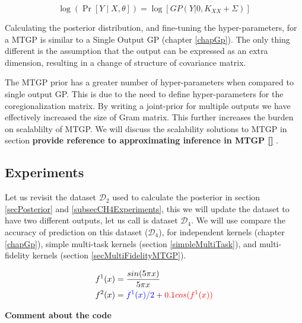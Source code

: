   \begin{equation}\label{eq:exactMONLML}
\log(\Pr[Y \mid X, \theta]) = \log[GP(Y| 0, K_{XX} + \Sigma )]
  \end{equation}
  
Calculating the posterior distribution, and fine-tuning the hyper-parameters, for a MTGP is similar to a Single Output GP (chapter \ref{chapGp}). The only thing different is the assumption that the output can be expressed as an extra dimension, resulting in a change of structure of covariance matrix. 

The MTGP prior has a greater number of hyper-parameters when compared to single output GP. This is due to the need to define hyper-parameters for the coregionalization matrix. By writing a joint-prior for multiple outputs we have effectively increased the size of Gram matrix. This further increases the burden on scalablilty of MTGP. We will discuss the scalability solutions to MTGP in section \textbf{provide reference to approximating inference in MTGP \ref{} }. 

\subsection{Experiments}\label{subsecCh6Experiments}
\begin{mdframed}[hidealllines=true,backgroundcolor=lightgray!20]
Let us revisit the dataset $\mathcal{D}_{2}$ used to calculate the posterior in section \ref{secPosterior} and \ref{subsecCH4Experiments}, this we will update the dataset to have two different outputs, let us call is dataset $\mathcal{D}_{4}$. We will use compare the accuracy of prediction on this dataset ($\mathcal{D}_{4}$), for independent kernels (chapter \ref{chapGp}), simple multi-task kernels (section \ref{simpleMultiTask}), and multi-fidelity kernels (section \ref{secMultiFidelityMTGP}). 

\begin{align}\label{eqFunctionForD4}
f^{1}(x) & = \frac{sin(5 \pi x)}{5 \pi x} \\
f^{2}(x) & = \textcolor{blue}{f^{1}(x)/2} +\textcolor{red}{0.1cos(f^{1}(x))}
\end{align}


\textbf{Comment about the code}

\end{mdframed}

